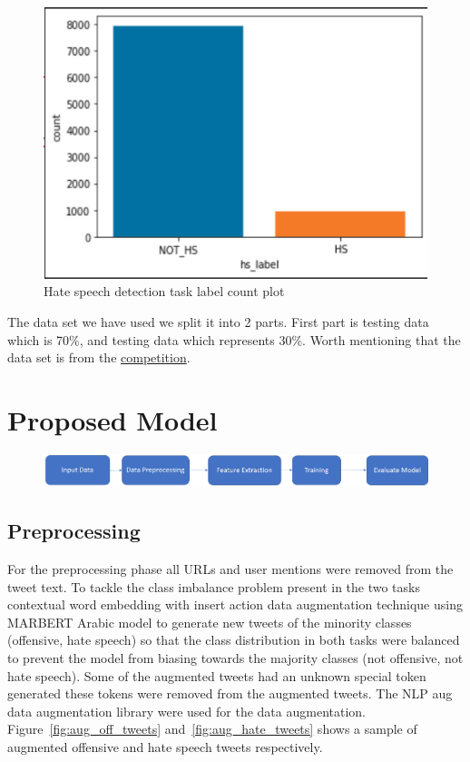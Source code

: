 \documentclass[10pt, a4paper]{article}
\begin{document}
\begin{figure}[htbp]
	\includegraphics[width=\columnwidth, height=0.30\paperwidth]{07.png}
	\caption{Hate speech detection task label count plot}
	\label{fig:hate_speech}
\end{figure}

The data set we have used we split it into 2 parts. First part is testing data which is 70\%, and testing data which represents 30\%. Worth mentioning that the data set is from the \href{https://sites.google.com/view/arabichate2022/home}{competition}.

\section{Proposed Model}\label{sec:proposed_model}

\begin{figure}[htbp]
	\includegraphics[width=\columnwidth, height=0.04\textheight]{04.png}
\end{figure}

\subsection{Preprocessing}
For the preprocessing phase all URLs and user mentions were removed from the tweet text. To tackle the class imbalance problem present in the two tasks contextual word embedding with insert action data augmentation technique using MARBERT Arabic model to generate new tweets of the minority classes (offensive, hate speech) so that the class distribution in both tasks were balanced to prevent the model from biasing towards the majority classes (not offensive, not hate speech). Some of the augmented tweets had an unknown special token generated these tokens were removed from the augmented tweets. The NLP aug ~\cite{al2020hate} data augmentation library were used for the data augmentation. Figure~\ref{fig:aug_off_tweets} and~\ref{fig:aug_hate_tweets} shows a sample of augmented offensive and hate speech tweets respectively.
\end{document}
